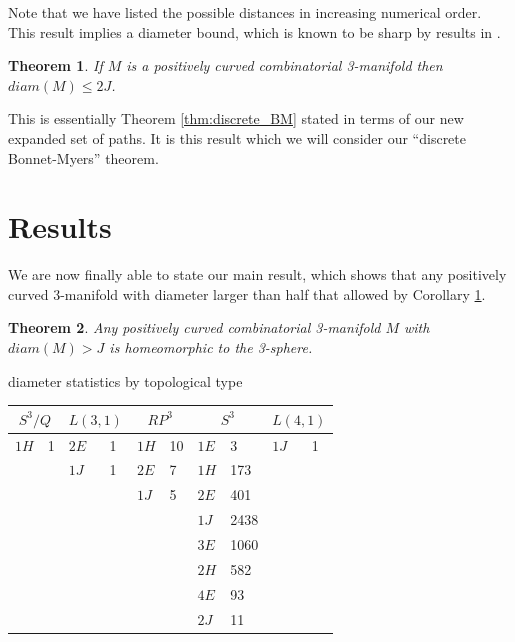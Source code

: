 \documentclass[12pt]{article}
\newtheorem{thm}{Theorem}[section]
\begin{document}
\noindent Note that we have listed the possible distances in increasing numerical order. This result implies a diameter bound, which is known to be sharp by results in \cite{Trout10}.

\begin{thm} If $M$ is a positively curved combinatorial 3-manifold then $diam(M) \leq 2J$.
\label{thm:discrete_BM_expanded_paths}
\end{thm}

\noindent This is essentially Theorem \ref{thm:discrete_BM} stated in terms of our new expanded set of paths. It is this result which we will consider our ``discrete Bonnet-Myers'' theorem.

\section{Results}
We are now finally able to state our main result, which shows that any positively curved 3-manifold with diameter larger than half that allowed by Corollary \ref{thm:discrete_BM_expanded_paths}.

\begin{thm} Any positively curved combinatorial 3-manifold $M$ with $diam(M)>J$ is homeomorphic to the 3-sphere.
\label{thm:discrete_GS}
\end{thm}





diameter statistics by topological type

\begin{tabular} {| l l | l l | l l | l l | l l |}
\hline
\multicolumn{2}{|c|}{$S^{3}/Q$} &
\multicolumn{2}{|c|}{$L(3,1)$} &
\multicolumn{2}{|c|}{$RP^{3}$} &
\multicolumn{2}{|c|}{$S^{3}$} &
\multicolumn{2}{|c|}{$L(4,1)$} \\
\hline
\hline
$1H$&1    &$2E$&1    &$1H$&10    &$1E$&3    &$1J$&1 \\
  &       &$1J$&1    &$2E$&7     &$1H$&173  &    &  \\
  &       &  &       &$1J$&5     &$2E$&401  &    &  \\
  &       &  &       &    &      &$1J$&2438 &    &  \\
  &       &  &       &    &      &$3E$&1060 &    &  \\
  &       &  &       &    &      &$2H$&582  &    &  \\
  &       &  &       &    &      &$4E$&93   &    &  \\
  &       &  &       &    &      &$2J$&11   &    &  \\
\hline
\end{tabular}
\end{document}
